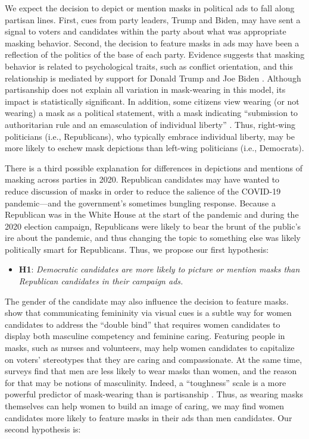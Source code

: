 We expect the decision to depict or mention masks in political ads to fall along partisan lines.  First, cues from party leaders, Trump and Biden, may have sent a signal to voters and candidates within the party about what was appropriate masking behavior.  Second, the decision to feature masks in ads may have been a reflection of the politics of the base of each party. Evidence suggests that masking behavior is related to psychological traits, such as conflict orientation, and this relationship is mediated by support for Donald Trump and Joe Biden \parencite{young_politics_2022}. Although partisanship does not explain all variation in mask-wearing in this model, its impact is statistically significant. In addition, some citizens view wearing (or not wearing) a mask as a political statement, with a mask indicating ``submission to authoritarian rule and an emasculation of individual liberty'' \parencite{ike_face_2020}.  Thus, right-wing politicians (i.e., Republicans), who typically embrace individual liberty, may be more likely to eschew mask depictions than left-wing politicians (i.e., Democrats).

There is a third possible explanation for differences in depictions and mentions of masking across parties in 2020.  Republican candidates may have wanted to reduce discussion of masks in order to reduce the salience of the COVID-19 pandemic---and the government's sometimes bungling response. Because a Republican was in the White House at the start of the pandemic and during the 2020 election campaign, Republicans were likely to bear the brunt of the public's ire about the pandemic, and thus changing the topic to something else was likely politically smart for Republicans.  Thus, we propose our first hypothesis:  

\begin{itemize}
\item[]
\textbf{H1}: \textit{Democratic candidates are more likely to picture or mention masks than Republican candidates in their campaign ads.}
\end{itemize}

The gender of the candidate may also influence the decision to feature masks. \cite{carpinella2021visual} show that communicating femininity via visual cues is a subtle way for women candidates to address the ``double bind'' \parencite{dittmar2015navigating} that requires women candidates to display both masculine competency and feminine caring. Featuring people in masks, such as nurses and volunteers, may help women candidates to capitalize on voters' stereotypes that they are caring and compassionate. At the same time, surveys find that men are less likely to wear masks than women, and the reason for that may be notions of masculinity. Indeed, a ``toughness'' scale is a more powerful predictor of mask-wearing than is partisanship \parencite{palmer_toxic_2020}. Thus, as wearing masks themselves can help women to build an image of caring, we may find women candidates more likely to feature masks in their ads than men candidates.  Our second hypothesis is:

